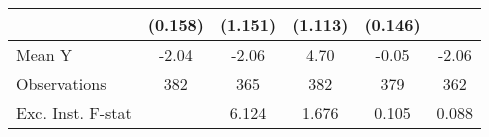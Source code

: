 {\begin{tabular}{l*{5}{c}}
            &     (0.158)         &     (1.151)         &     (1.113)         &     (0.146)         &                     \\
\midrule
Mean Y      &       -2.04         &       -2.06         &        4.70         &       -0.05         &       -2.06         \\
Observations&         382         &         365         &         382         &         379         &         362         \\
Exc. Inst. F-stat&                     &       6.124         &       1.676         &       0.105         &       0.088         \\
\bottomrule
\end{tabular}
}
